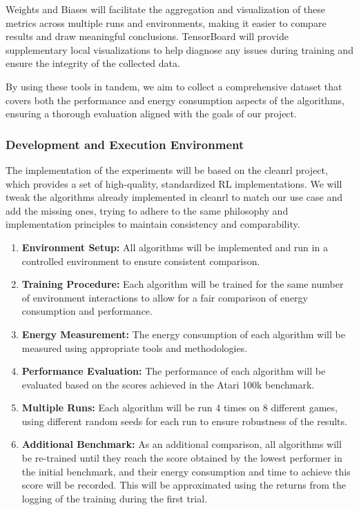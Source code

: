 Weights and Biases will facilitate the aggregation and visualization of these metrics across multiple runs and environments, making it easier to compare results and draw meaningful conclusions. TensorBoard will provide supplementary local visualizations to help diagnose any issues during training and ensure the integrity of the collected data.

By using these tools in tandem, we aim to collect a comprehensive dataset that covers both the performance and energy consumption aspects of the algorithms, ensuring a thorough evaluation aligned with the goals of our project.

\subsubsection{Development and Execution Environment}
\label{subsubsec:development_execution_environment}



The implementation of the experiments will be based on the cleanrl project, which provides a set of high-quality, standardized RL implementations. We will tweak the algorithms already implemented in cleanrl to match our use case and add the missing ones, trying to adhere to the same philosophy and implementation principles to maintain consistency and comparability.

\begin{enumerate}
	\item \textbf{Environment Setup:} All algorithms will be implemented and run in a controlled environment to ensure consistent comparison.
	\item \textbf{Training Procedure:} Each algorithm will be trained for the same number of environment interactions to allow for a fair comparison of energy consumption and performance.
	\item \textbf{Energy Measurement:} The energy consumption of each algorithm will be measured using appropriate tools and methodologies.
	\item \textbf{Performance Evaluation:} The performance of each algorithm will be evaluated based on the scores achieved in the Atari 100k benchmark.
	\item \textbf{Multiple Runs:} Each algorithm will be run 4 times on 8 different games, using different random seeds for each run to ensure robustness of the results.
	\item \textbf{Additional Benchmark:} As an additional comparison, all algorithms will be re-trained until they reach the score obtained by the lowest performer in the initial benchmark, and their energy consumption and time to achieve this score will be recorded. This will be approximated using the returns from the logging of the training during the first trial.
\end{enumerate}

